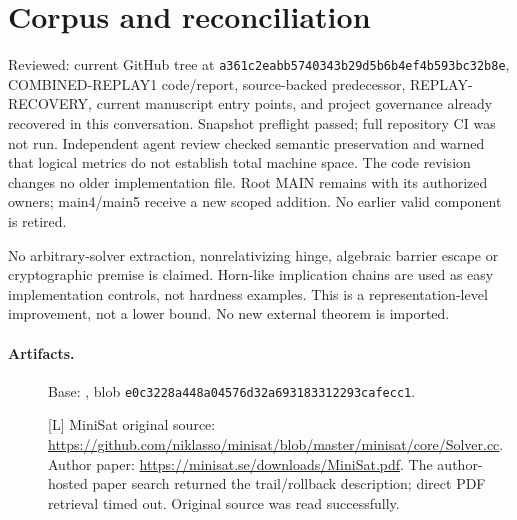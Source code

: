 \documentclass[11pt]{article}
\begin{document}
\section{Corpus and reconciliation}
Reviewed: current GitHub tree at
\texttt{a361c2eabb5740343b29d5b6b4ef4b593bc32b8e},
COMBINED-REPLAY1 code/report, source-backed predecessor,
REPLAY-RECOVERY, current manuscript entry points, and project governance
already recovered in this conversation. Snapshot preflight passed;
full repository CI was not run.
Independent agent review checked semantic preservation and warned that
logical metrics do not establish total machine space.
The code revision changes no older implementation file.
Root MAIN remains with its authorized owners; main4/main5 receive a new
scoped addition. No earlier valid component is retired.

No arbitrary-solver extraction, nonrelativizing hinge, algebraic barrier
escape or cryptographic premise is claimed. Horn-like implication chains
are used as easy implementation controls, not hardness examples.
This is a representation-level improvement, not a lower bound.
No new external theorem is imported.

\paragraph{Artifacts.}
\begin{description}
\item[] 
\item[] 
\item[] 
\item[] 
\item[] Base: ,
blob \texttt{e0c3228a448a04576d32a693183312293cafecc1}.
\item[] [L] MiniSat original source:
\url{https://github.com/niklasso/minisat/blob/master/minisat/core/Solver.cc}.
Author paper: \url{https://minisat.se/downloads/MiniSat.pdf}.
The author-hosted paper search returned the trail/rollback description;
direct PDF retrieval timed out. Original source was read successfully.
\end{description}
\end{document}
